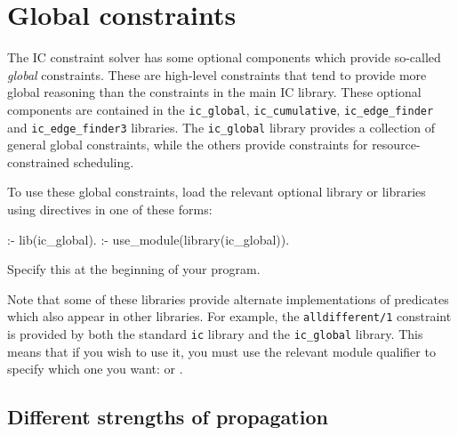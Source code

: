 
\section{Global constraints}
\label{secglobal}


The IC constraint solver has some optional components which provide
so-called \emph{global} constraints.  These are high-level constraints that
tend to provide more global reasoning than the constraints in the main IC
library.  These optional components are contained in the \texttt{ic_global},
\texttt{ic_cumulative},
\texttt{ic_edge_finder}
and \texttt{ic_edge_finder3}
libraries.  The \texttt{ic_global} library provides a collection of general
global constraints, while the others provide constraints for
resource-constrained scheduling.

To use these global constraints, load the relevant optional library or
libraries using directives in one of these forms:
\begin{code}
:- lib(ic_global).
:- use_module(library(ic_global)).
\end{code}
Specify this at the beginning of your program.

Note that some of these libraries provide alternate implementations of
predicates which also appear in other libraries.  For example, the
\texttt{alldifferent/1} constraint is provided by both the standard
\texttt{ic} library and the \texttt{ic_global} library.  This means that if
you wish to use it, you must use the relevant module qualifier to specify
which one you want:
 or
.




\subsection{Different strengths of propagation}

